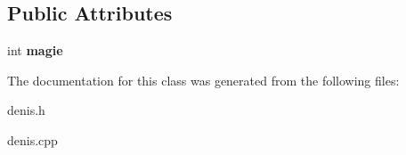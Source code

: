 \subsection*{Public Attributes}
\begin{DoxyCompactItemize}
\item 
\mbox{\label{classAnimauxDeDenis_a42f9bd30c663ce2227ae4df0aa36914b}} 
int {\bfseries magie}
\end{DoxyCompactItemize}


The documentation for this class was generated from the following files\+:\begin{DoxyCompactItemize}
\item 
denis.\+h\item 
denis.\+cpp\end{DoxyCompactItemize}
